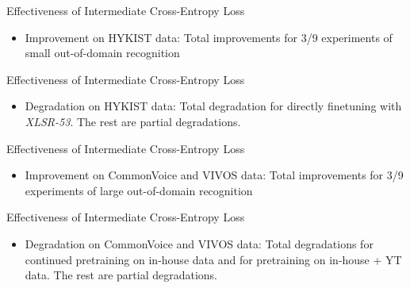 \begin{frame}{Effectiveness of Intermediate Cross-Entropy Loss}
\begin{itemize}
    \item Improvement on HYKIST data: Total improvements for 3/9 experiments of small out-of-domain recognition
\end{itemize}

\end{frame}


\begin{frame}{Effectiveness of Intermediate Cross-Entropy Loss}
\begin{itemize}
    \item Degradation on HYKIST data: Total degradation for directly finetuning with \textit{XLSR-53}. The rest are partial degradations.
\end{itemize}

\end{frame}


\begin{frame}{Effectiveness of Intermediate Cross-Entropy Loss}
\begin{itemize}
    \item Improvement on CommonVoice and VIVOS data: Total improvements for 3/9 experiments of large out-of-domain recognition
\end{itemize}

\end{frame}


\begin{frame}{Effectiveness of Intermediate Cross-Entropy Loss}
\begin{itemize}
    \item Degradation on CommonVoice and VIVOS data: Total degradations for continued pretraining on in-house data and for pretraining on in-house + YT data.
    The rest are partial degradations.
\end{itemize}

\end{frame}
